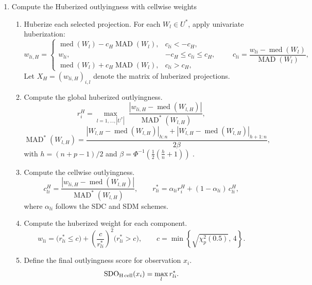 \documentclass[12pt]{article}
\begin{document}
\begin{enumerate}
   


    \item {Compute the Huberized outlyingness with cellwise weights}

\begin{enumerate}
    \item {Huberize each selected projection.} For each \( W_l \in U^* \), apply univariate huberization:
    \[
    w_{li,H}= 
    \begin{cases}
    \operatorname{med}(W_l)-c_H\operatorname{MAD}(W_l), & c_{li}< -c_H,\\
    w_{li}, & -c_H\le c_{li}\le c_H,\\
    \operatorname{med}(W_l)+c_H\operatorname{MAD}(W_l), & c_{li}> c_H,
    \end{cases}
    \qquad 
    c_{li}= \dfrac{w_{li}-\operatorname{med}(W_l)}{\operatorname{MAD}(W_l)},
    \]
    Let \( X_H = (w_{li,H})_{i,l} \) denote the matrix of huberized projections.

    \item {Compute the global huberized outlyingness.}
    \[
    r_i^{H}= \max_{l=1,\dots,|U^*|}\;
    \frac{\left|w_{li,H}-\operatorname{med}(W_{l,H})\right|}
         {\operatorname{MAD}^{*}(W_{l,H})},\]
     \[    
    \operatorname{MAD}^{*}(W_{l,H})=
    \frac{|W_{l,H}-\operatorname{med}(W_{l,H})|_{h:n}+|W_{l,H}-\operatorname{med}(W_{l,H})|_{h+1:n}}
         {2\beta},
    \]
    with \( h = (n+p-1)/2 \) and \( \beta = \Phi^{-1} \left( \frac12 \left( \frac{h}{n} + 1 \right) \right) \) .

    \item {Compute the cellwise outlyingness.}
    \[
    c_{li}^{H}= \frac{|w_{li,H}-\operatorname{med}(W_{l,H})|}
                    {\operatorname{MAD}^{*}(W_{l,H})},\qquad
    r_{li}^{*}= \alpha_{li} r_i^{H} + (1-\alpha_{li})\,c_{li}^{H},
    \]
    where \( \alpha_{li}\) follows the SDC and SDM schemes.

    \item{Compute the huberized weight for each component.}
    \[
    w_{li}= \mathbb(r_{li}^{*}\le c)+\left(\frac{c}{r_{li}^{*}}\right)^{2}\mathbb(r_{li}^{*}>c),\qquad
    c=\min\!\left\{\sqrt{\chi^{2}_{p}(0.5)},\,4\right\}.
    \]

    \item{Define the final outlyingness score for observation \( x_i \).}
    \[
    \operatorname{SDO}_{\text{H\,cell}}(x_i)=\max_{l} r_{li}^{*}.
    \]
\end{enumerate}


\end{enumerate}
\end{document}
